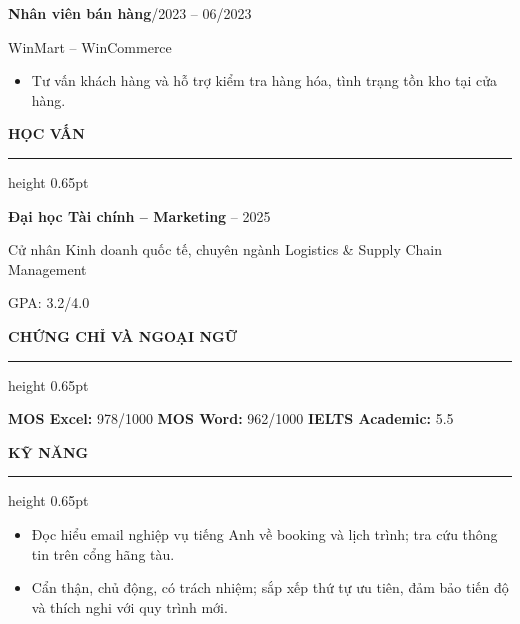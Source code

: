 \documentclass[10pt,a4paper]{article}
\newcommand{\cvsection}[1]{%
  \par\vspace{11pt}\needspace{4\baselineskip}%
  {\color{slate}\bfseries\fontsize{11.9}{14.5}\selectfont #1}\par\vspace{5pt}%
  {\color{rule}\hrule height 0.65pt}\vspace{7pt}%
}
\newcommand{\cvjob}[3]{%
  {\bfseries #1}\hfill {\color{muted}\fontsize{9.4}{12.3}\selectfont #2}\par\vspace{2pt}%
  {\color{muted}#3}\par%
}
\begin{document}
\vspace{5pt}
\cvjob{Nhân viên bán hàng}{03/2023 -- 06/2023}{WinMart -- WinCommerce}
\begin{itemize}
  \item Tư vấn khách hàng và hỗ trợ kiểm tra hàng hóa, tình trạng tồn kho tại cửa hàng.
\end{itemize}

\cvsection{HỌC VẤN}
\textbf{Đại học Tài chính -- Marketing}\hfill {\color{muted}\fontsize{9.4}{12.3} -- 2025}\par\vspace{3pt}
Cử nhân Kinh doanh quốc tế, chuyên ngành Logistics \& Supply Chain Management\par\vspace{2pt}
GPA: 3.2/4.0

\cvsection{CHỨNG CHỈ VÀ NGOẠI NGỮ}
\textbf{MOS Excel:} 978/1000 \enspace\textbullet\enspace \textbf{MOS Word:} 962/1000 \enspace\textbullet\enspace \textbf{IELTS Academic:} 5.5


\cvsection{KỸ NĂNG}
\begin{itemize}
  \item Đọc hiểu email nghiệp vụ tiếng Anh về booking và lịch trình; tra cứu thông tin trên cổng hãng tàu.
  \item Cẩn thận, chủ động, có trách nhiệm; sắp xếp thứ tự ưu tiên, đảm bảo tiến độ và thích nghi với quy trình mới.
\end{itemize}
\end{document}
